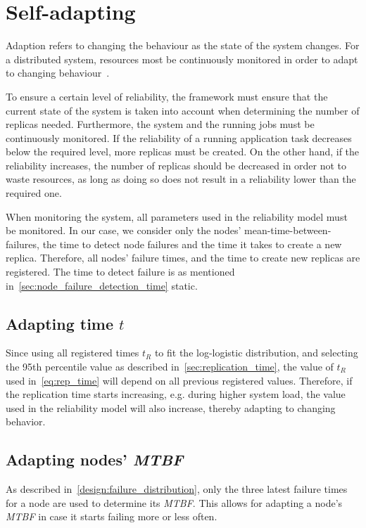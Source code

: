 \documentclass{cslthse-msc}
\begin{document}
\section{Self-adapting} \label{sec:design_self_adapting}
Adaption refers to changing the behaviour as the state of the system changes. For a distributed system, resources most be continuously monitored in order to adapt to changing behaviour~\cite{imprRelAdaptRL}.

To ensure a certain level of reliability, the framework must ensure that the current state of the system is taken into account when determining the number of replicas needed. Furthermore, the system and the running jobs must be continuously monitored. If the reliability of a running application task decreases below the required level, more replicas must be created. On the other hand, if the reliability increases, the number of replicas should be decreased in order not to waste resources, as long as doing so does not result in a reliability lower than the required one.

When monitoring the system, all parameters used in the reliability model must be monitored. In our case, we consider only the nodes' mean-time-between-failures, the time to detect node failures and the time it takes to create a new replica. Therefore, all nodes' failure times, and the time to create new replicas are registered. The time to detect failure is as mentioned in~\cref{sec:node_failure_detection_time} static.

\subsection{Adapting time $t$}
Since using all registered times $t_R$ to fit the log-logistic distribution, and selecting the 95th percentile value as described in~\cref{sec:replication_time}, the value of $t_R$ used in~\cref{eq:rep_time} will depend on all previous registered values. Therefore, if the replication time starts increasing, e.g. during higher system load, the value used in the reliability model will also increase, thereby adapting to changing behavior. 

\subsection{Adapting nodes' \emph{MTBF}} \label{sec:design_self_adapting_mtbf}
As described in~\cref{design:failure_distribution}, only the three latest failure times for a node are used to determine its \emph{MTBF}. This allows for adapting a node's \emph{MTBF} in case it starts failing more or less often. 
\end{document}
